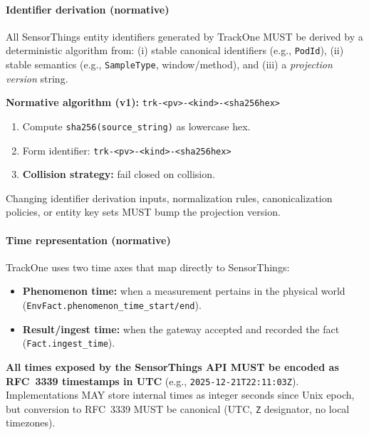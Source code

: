 \paragraph{Identifier derivation (normative)}
All SensorThings entity identifiers generated by TrackOne MUST be derived by a deterministic algorithm from:
(i) stable canonical identifiers (e.g., \texttt{PodId}), (ii) stable semantics (e.g., \texttt{SampleType}, window/method),
and (iii) a \emph{projection version} string.

\textbf{Normative algorithm (v1):} \texttt{trk-<pv>-<kind>-<sha256hex>}
\begin{enumerate}[nosep]
  \item Compute \texttt{sha256(source\_string)} as lowercase hex.
  \item Form identifier: \texttt{trk-<pv>-<kind>-<sha256hex>}
  \item \textbf{Collision strategy:} fail closed on collision.
\end{enumerate}
Changing identifier derivation inputs, normalization rules, canonicalization policies, or entity key sets MUST bump the
projection version.



\paragraph{Time representation (normative)}
TrackOne uses two time axes that map directly to SensorThings:
\begin{itemize}[nosep]
  \item \textbf{Phenomenon time:} when a measurement pertains in the physical world
    (\texttt{EnvFact.phenomenon\_time\_start/end}).
  \item \textbf{Result/ingest time:} when the gateway accepted and recorded the fact (\texttt{Fact.ingest\_time}).
\end{itemize}
\textbf{All times exposed by the SensorThings API MUST be encoded as RFC~3339 timestamps in UTC} (e.g.,
\texttt{2025-12-21T22:11:03Z}).
Implementations MAY store internal times as integer seconds since Unix epoch, but
conversion to \ac{RFC}~3339 MUST be canonical (\ac{UTC}, \texttt{Z} designator, no local timezones).

